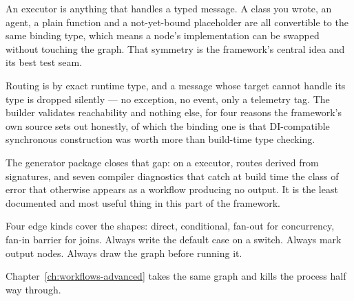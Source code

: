 An executor is anything that handles a typed message. A class you wrote, an
agent, a plain function and a not-yet-bound placeholder are all convertible to
the same binding type, which means a node's implementation can be swapped without
touching the graph. That symmetry is the framework's central idea and its best
test seam.

Routing is by exact runtime type, and a message whose target cannot handle its
type is dropped silently --- no exception, no event, only a telemetry tag. The
builder validates reachability and nothing else, for four reasons the framework's
own source sets out honestly, of which the binding one is that DI-compatible
synchronous construction was worth more than build-time type checking.

The generator package closes that gap: \code{[MessageHandler]} on a
 executor, routes derived from signatures, and seven compiler
diagnostics that catch at build time the class of error that otherwise appears as
a workflow producing no output. It is the least documented and most useful thing
in this part of the framework.

Four edge kinds cover the shapes: direct, conditional, fan-out for concurrency,
fan-in barrier for joins. Always write the default case on a switch. Always mark
output nodes. Always draw the graph before running it.

Chapter~\ref{ch:workflows-advanced} takes the same graph and kills the process
half way through.
